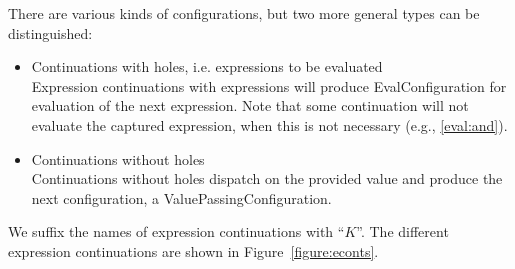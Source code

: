 \documentclass{article}
\begin{document}
There are various kinds of configurations, but two more general types can be distinguished:
\begin{itemize}
\item Continuations with holes, i.e. expressions to be evaluated\\
Expression continuations with expressions will produce EvalConfiguration for evaluation of the next expression.
Note that some continuation will not evaluate the captured expression, when this is not necessary (e.g., \eqref{eval:and}).

\item Continuations without holes\\
Continuations without holes dispatch on the provided value and produce the next configuration, a ValuePassingConfiguration.
\end{itemize}
We suffix the names of expression continuations with ``$K$''.
The different expression continuations are shown in Figure~\ref{figure:econts}.
%
\newcommand{\ExceptionHandlersRest}{\handler,\,\cstrace,\,\cex}
\newcommand{\ExceptionHandlers}{\strace,\,\handler,\,\cstrace,\,\cex}
\newcommand{\VarSetK}[3]{\mathrm{VarSetK}({#1},\,{#2},\,{#3})}
\newcommand{\ExpressionsK}[3]{\mathrm{ExpressionsK}({#1},\,{#2},\,\ExceptionHandlers,\,{#3})}
%
\newcommand{\NotK}[1]{\mathrm{NotK}({#1})}
\newcommand{\AndK}[3]{\mathrm{AndK}({#1},\,{#2},\,\ExceptionHandlers,\,{#3})}
\newcommand{\OrK}[3]{\mathrm{OrK}({#1},\,{#2},\,\ExceptionHandlers,\,{#3})}
\newcommand{\ConditionalK}[4]{\mathrm{ConditionalK}({#1},\,{#2},\,{#3},\,\ExceptionHandlers,\,{#4})}
%
\newcommand{\LetK}[4]{\mathrm{LetK}({#1},\,{#2},\,{#3},\,\ExceptionHandlers,\,{#4})}
%
\newcommand{\IsExpressionK}{\mathrm{IsExpressionK}(\tt{T},\,\econt)}
\newcommand{\AsExpressionK}{\mathrm{AsExpressionK}(\tt{T},\,\strace,\,\handler,\,\econt)}
%
\newcommand{\StaticGetK}{\mathrm{StaticGetK}(\membermeta,\,\econt)}
\newcommand{\StaticSetK}{\mathrm{StaticSetK}(\membermeta,\,\econt)}
\newcommand{\PropertyGetK}{\mathrm{PropertyGetK}(\idmeta,\,\ExceptionHandlers,\,\econt)}
\newcommand{\PropertySetK}{\mathrm{PropertySetK}(\idmeta,\,\expressionmeta_1,\,\env,\,\ExceptionHandlers,\,\econt)}
\newcommand{\PropertySetVK}{\mathrm{PropertySetValueK}(\val_0,\,\idmeta,\,\ExceptionHandlers,\,\econt)}
\newcommand{\DPropertyGetK}{\mathrm{DPropertyGetK}(\membermeta,\,\ExceptionHandlers,\,\econt)}
\newcommand{\DirectPropertySetK}{\mathrm{DPropertySetK}(\membermeta,\,\expressionmeta_1,\,\env,\,\ExceptionHandlers,\,\econt)}
\newcommand{\DPropertySetVK}{\mathrm{DPropertySetValueK}(\val_0,\,\membermeta,\,\ExceptionHandlers,\,\econt)}
\end{document}
